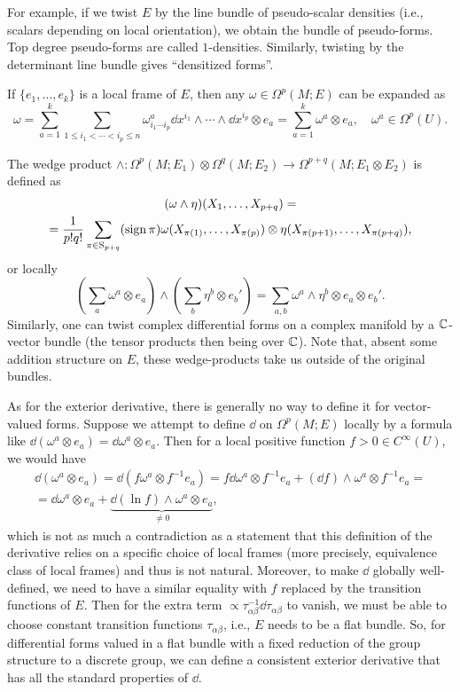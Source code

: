 For example, if we twist $E$ by the line bundle of pseudo-scalar densities (i.e., scalars depending on local orientation), we obtain the bundle of pseudo-forms. Top degree pseudo-forms are called $1$-densities. Similarly, twisting by the determinant line bundle gives ``densitized forms''.

If $\{e_1,\ldots,e_k\}$ is a local frame of $E$, then any $\omega\in\Omega^p(M;E)$ can be expanded as 
\[\omega=\sum_{a=1}^k\sum_{1\leq i_1<\cdots<i_p\leq n}\omega^a_{i_1\cdots i_p}\dd x^{i_1}\wedge\cdots\wedge \dd x^{i_p}\otimes e_a=\sum_{a=1}^k\omega^a\otimes e_a,\quad \omega^a\in\Omega^p(U).\]

The wedge product $\wedge:\Omega^p(M;E_1)\otimes \Omega^q(M;E_2)\to \Omega^{p+q}(M;E_1\otimes E_2)$ is defined as 
\begin{multline}
    (\omega\wedge\eta)(X_1,\ldots,X_{p+q})=\\=\frac{1}{p!q!}\sum_{\pi\in \mathrm{S}_{p+q}}(\operatorname{sign}\pi)\omega(X_{\pi(1)},\ldots,X_{\pi(p)})\otimes\eta(X_{\pi(p+1)},\ldots,X_{\pi(p+q)}),
\end{multline}
or locally 
\[\left(\sum_a\omega^a\otimes e_a\right)\wedge \left(\sum_b\eta^b\otimes e_b'\right)=\sum_{a,b}\omega^a\wedge\eta^b\otimes e_a\otimes e_b'.\]
Similarly, one can twist complex differential forms on a complex manifold by a  $\mathbb{C}$-vector bundle (the tensor products then being over $\mathbb{C}$). Note that, absent some addition structure on $E$, these wedge-products take us outside of the original bundles.

\begin{rem}
    As for the exterior derivative, there is generally no way to define it for vector-valued forms.
    Suppose we attempt to define $\dd$ on $\Omega^p(M;E)$ locally by a formula like $\dd(\omega^a\otimes e_a)=\dd \omega^a\otimes e_a$. Then for a local positive function $f>0\in C^\infty(U)$, we would have 
    \begin{multline}
        \dd(\omega^a\otimes e_a)=\dd(f\omega^a\otimes f^{-1}e_a)=f\dd\omega^a\otimes f^{-1}e_a+(\dd f)\wedge\omega^a\otimes f^{-1}e_a=\\=\dd\omega^a\otimes e_a+\underbrace{\dd(\ln f)\wedge\omega^a\otimes e_a}_{\neq 0},
    \end{multline}
    which is not as much a contradiction as a statement that this definition of the derivative relies on a specific choice of local frames (more precisely, equivalence class of local frames) and thus is not natural. Moreover, to make $\dd$ globally well-defined, we need to have a similar equality with $f$ replaced by the transition functions of $E$. Then for the extra term $\propto \tau_{\alpha\beta}^{-1}\dd\tau_{\alpha\beta}$ to vanish, we must be able to choose constant transition functions $\tau_{\alpha\beta}$, i.e., $E$ needs to be a flat bundle. So, for differential forms valued in a flat bundle with a fixed reduction of the group structure to a discrete group, we can define a consistent exterior derivative that has all the standard properties of $\dd$.
\end{rem}

